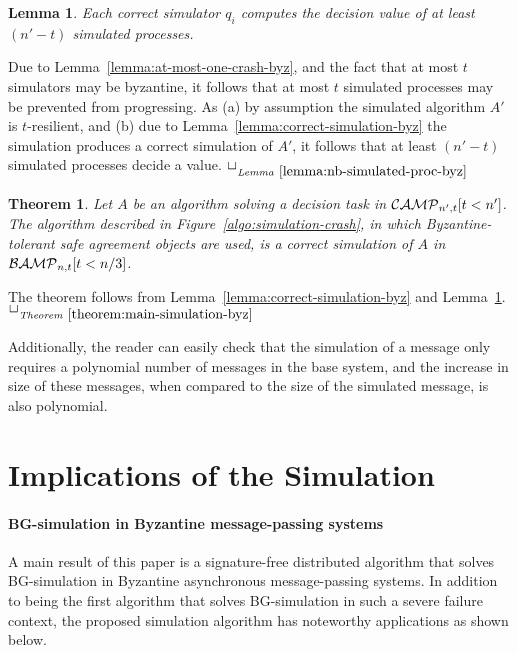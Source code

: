 \documentclass[11pt,letterpaper]{article}
\newtheorem{theorem}{Theorem}
\newtheorem{lemma}{Lemma}
\newlength {\afterproof}
\newcommand{\toto}{xxx}
\newenvironment{proofT}{\noindent{\bf Proof }}
{\hspace*{\fill}$\Box_{\mathit{Theorem}~\ref{\toto}}$\par\vspace{\afterproof}}
\newenvironment{proofL}{\noindent{\bf Proof }}
{\hspace*{\fill}$\Box_{\mathit{Lemma}~\ref{\toto}}$\par\vspace{\afterproof}}
\newcommand{\CMprim}{{\cal CAMP}_{n',t}}
\newcommand{\BM}{{\cal BAMP}_{n,t}}
\begin{document}
\begin{lemma}
\label{lemma:nb-simulated-proc-byz}
Each correct simulator $q_i$ computes the decision value of
at least $(n'-t)$ simulated processes.
\end{lemma}

\begin{proofL}
Due to Lemma~\ref{lemma:at-most-one-crash-byz}, and the fact that at
most $t$ simulators may be byzantine, it follows that at most $t$
simulated processes may be prevented from progressing. As (a) by
assumption the simulated algorithm $A'$ is $t$-resilient, and (b) due
to Lemma~\ref{lemma:correct-simulation-byz} the simulation produces a
correct simulation of $A'$, it follows that at least $(n'-t)$
simulated processes decide a value.
\renewcommand{\toto}{lemma:nb-simulated-proc-byz}
\end{proofL}



\begin{theorem}
\label{theorem:main-simulation-byz}
Let $A$ be an algorithm solving a decision task in $\CMprim[t<n']$.
The algorithm described in Figure~\ref{algo:simulation-crash},
in which Byzantine-tolerant safe agreement objects are used, is a
correct simulation of $A$ in~$\BM[t<n/3]$.
\end{theorem}

\begin{proofT}
The theorem follows from Lemma~\ref{lemma:correct-simulation-byz} and
Lemma~\ref{lemma:nb-simulated-proc-byz}.
\renewcommand{\toto}{theorem:main-simulation-byz}
\end{proofT}

Additionally, the reader can easily check that the simulation of a message only requires 
a polynomial number of messages in the base system, and the increase in size of these messages,
when compared to the size of the simulated message, is
also polynomial.

\section{Implications of the Simulation} \label{sec:conclusion}
\paragraph{BG-simulation in Byzantine message-passing systems} 
A main result of this  paper is a signature-free
distributed algorithm that solves  
BG-simulation in Byzantine asynchronous message-passing systems.
In addition to being the first  algorithm  that solves
BG-simulation in such a severe failure context, the proposed simulation
algorithm has noteworthy applications as shown below. 
\end{document}
